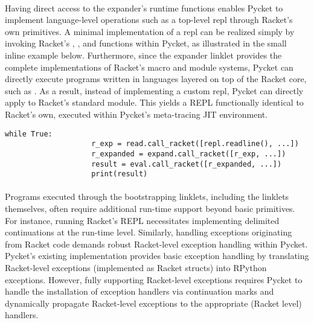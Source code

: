 			\paragraph{}%
				Having direct access to the expander's runtime functions enables Pycket to implement language-level operations such as a top-level \gls{repl} through Racket's own primitives. A minimal implementation of a \gls{repl} can be realized simply by invoking Racket's , , and  functions within Pycket, as illustrated in the small inline example below. Furthermore, since the expander linklet provides the complete implementations of Racket's macro and module systems, Pycket can directly execute programs written in languages layered on top of the Racket core, such as . As a result, instead of implementing a custom \gls{repl}, Pycket can directly apply  to Racket's standard  module. This yields a REPL functionally identical to Racket’s own, executed within Pycket’s meta-tracing JIT environment.

			\begin{center}
				\begin{minipage}{0.75\textwidth}
					\begin{lstlisting}[style=inline-python,frame=lines,numbers=none]
				while True:
					r_exp = read.call_racket([repl.readline(), ...])
					r_expanded = expand.call_racket([r_exp, ...])
					result = eval.call_racket([r_expanded, ...])
					print(result)\end{lstlisting}
				\end{minipage}
			\end{center}

			\paragraph{}%
				Programs executed through the bootstrapping linklets, including the linklets themselves, often require additional run-time support beyond basic primitives. For instance, running Racket's REPL necessitates implementing delimited continuations at the run-time level. Similarly, handling exceptions originating from Racket code demands robust Racket-level exception handling within Pycket. Pycket's existing implementation provides basic exception handling by translating Racket-level exceptions (implemented as Racket structs) into RPython exceptions. However, fully supporting Racket-level exceptions requires Pycket to handle the installation of exception handlers via continuation marks and dynamically propagate Racket-level exceptions to the appropriate (Racket level) handlers.

